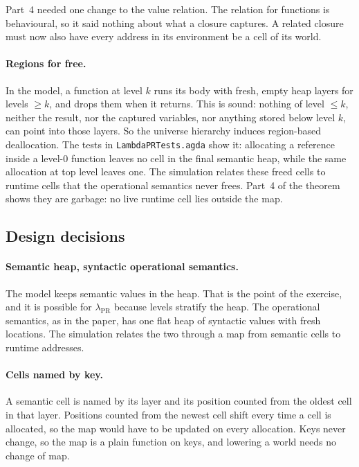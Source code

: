 \documentclass[11pt]{article}
\theoremstyle{remark}
\newcommand{\todo}[1]{\marginpar{\raggedright\footnotesize\textcolor{red!70!black}{\textbf{TODO:} #1}}}
\newcommand{\lpr}{\lambda_{\mathrm{PR}}}
\begin{document}
Part~4 needed one change to the value relation. The relation for functions
is behavioural, so it said nothing about what a closure captures. A related
closure must now also have every address in its environment be a cell of its
world.

\paragraph{Regions for free.}
In the model, a function at level $k$ runs its body with fresh, empty heap
layers for levels $\geq k$, and drops them when it returns. This is sound:
nothing of level $\leq k$, neither the result, nor the captured variables,
nor anything stored below level $k$, can point into those layers. So the
universe hierarchy induces region-based deallocation. The tests in
\texttt{LambdaPRTests.agda} show it: allocating a reference inside a
level-$0$ function leaves no cell in the final semantic heap, while the same
allocation at top level leaves one. The simulation relates these freed cells
to runtime cells that the operational semantics never frees. Part~4 of the
theorem shows they are garbage: no live runtime cell lies outside the map.

\subsection{Design decisions}
\label{sec:design}
\todo{Review these design decisions.}

\paragraph{Semantic heap, syntactic operational semantics.}
The model keeps semantic values in the heap. That is the point of the
exercise, and it is possible for $\lpr$ because levels stratify the heap. The
operational semantics, as in the paper, has one flat heap of syntactic values
with fresh locations. The simulation relates the two through a map from
semantic cells to runtime addresses.

\paragraph{Cells named by key.}
A semantic cell is named by its layer and its position counted from the
oldest cell in that layer. Positions counted from the newest cell shift every
time a cell is allocated, so the map would have to be updated on every
allocation. Keys never change, so the map is a plain function on keys, and
lowering a world needs no change of map.
\end{document}
